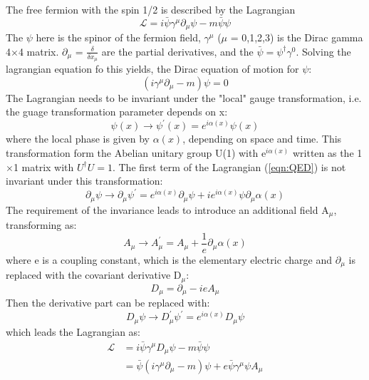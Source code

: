 The free fermion with the spin 1/2 is described by the Lagrangian\\
\begin{equation}
\label{eqn:QED}
\mathcal{L}=i \bar{\psi} \gamma^{\mu} \partial_{\mu} \psi-m \bar{\psi} \psi
\end{equation}
The $\psi$ here is the spinor of the fermion field, $\gamma^{\mu}$  ($\mu$ = 0,1,2,3) is the Dirac gamma 4$\times$4 matrix. $\partial_{\mu}$ = $\frac{\delta}{\delta x_{\mu}}$ are the partial derivatives, and the $\bar{\psi}=\psi^{\dagger} \gamma^{0}$.
Solving the lagrangian equation fo this yields, the Dirac equation of motion for $\psi$:
\begin{equation}
\left(i \gamma^{\mu} \partial_{\mu}-m\right) \psi=0
\end{equation}
The Lagrangian needs to be invariant under the "local" gauge transformation, i.e. the guage transformation parameter depends on x:
\begin{equation}
\psi(x) \rightarrow \psi^{\prime}(x)=e^{i \alpha(x)} \psi(x)
\end{equation}
where the local phase is given by $\alpha(x)$, depending on space and time. 
This transformation form the Abelian unitary group U(1) with e$^{i\alpha(x)}$ written as the 1$\times$1 matrix with $U^{\dagger} U=1$.
The first term of the Lagrangian (\ref{eqn:QED}) is not invariant under this transformation:
\begin{equation}
\partial_{\mu} \psi \rightarrow \partial_{\mu} \psi^{\prime}=e^{i \alpha(x)} \partial_{\mu} \psi+i e^{i \alpha(x)} \psi \partial_{\mu} \alpha(x)
\end{equation}
The requirement of the invariance leads to introduce an additional field A$_\mu$, transforming as:
\begin{equation}
A_{\mu} \rightarrow A_{\mu}^{\prime}=A_{\mu}+\frac{1}{e} \partial_{\mu} \alpha(x)
\end{equation}
where e is a coupling constant, which is the elementary electric charge 
and $\partial_{\mu}$ is replaced with the covariant derivative D$_\mu$:
\begin{equation}
D_{\mu}=\partial_{\mu}-i e A_{\mu}
\end{equation}
Then the derivative part can be replaced with:
\begin{equation}
D_{\mu} \psi \rightarrow D_{\mu}^{\prime} \psi^{\prime}=e^{i \alpha(x)} D_{\mu} \psi
\end{equation}
which leads the Lagrangian as:
\begin{equation}
\begin{aligned}
\mathcal{L} &=i \bar{\psi} \gamma^{\mu} D_{\mu} \psi-m \bar{\psi} \psi \\
&=\bar{\psi}\left(i \gamma^{\mu} \partial_{\mu}-m\right) \psi+e \bar{\psi} \gamma^{\mu} \psi A_{\mu}
\end{aligned}
\end{equation}
